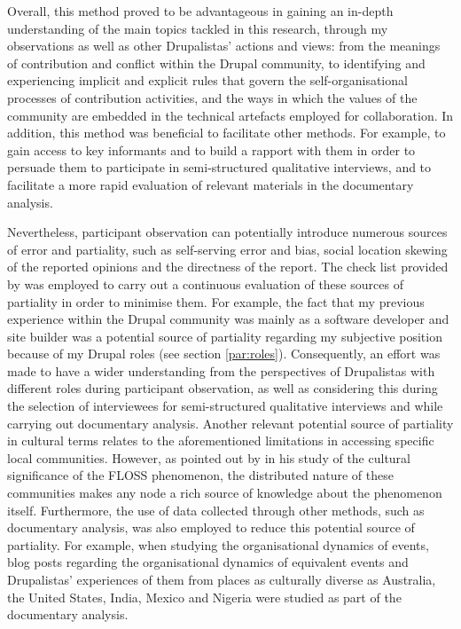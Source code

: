 Overall, this method proved to be advantageous in gaining an in-depth understanding of the main topics tackled in this research, through my observations as well as other Drupalistas' actions and views: from the meanings of contribution and conflict within the Drupal community, to identifying and experiencing implicit and explicit rules that govern the self-organisational processes of contribution activities, and the ways in which the values of the community are embedded in the technical artefacts employed for collaboration. In addition, this method was beneficial to facilitate other methods. For example, to gain access to key informants and to build a rapport with them in order to persuade them to participate in semi-structured qualitative interviews, and to facilitate a more rapid evaluation of relevant materials in the documentary analysis. 

Nevertheless, participant observation can potentially introduce numerous sources of error and partiality, such as self-serving error and bias, social location skewing of the reported opinions and the directness of the report. The check list provided by \textcite{lofland2006analyzing} was employed to carry out a continuous evaluation of these sources of partiality in order to minimise them. For example, the fact that my previous experience within the Drupal community was mainly as a software developer and site builder was a potential source of partiality regarding my subjective position because of my Drupal roles (see section \ref{par:roles}). Consequently, an effort was made to have a wider understanding from the perspectives of Drupalistas with different roles during participant observation, as well as considering this during the selection of interviewees for semi-structured qualitative interviews and while carrying out documentary analysis. Another relevant potential source of partiality in cultural terms relates to the aforementioned limitations in accessing specific local communities. However, as pointed out by \textcite{kelty2008two} in his study of the cultural significance of the FLOSS phenomenon, the distributed nature of these communities makes any node a rich source of knowledge about the phenomenon itself.  Furthermore, the use of data collected through other methods, such as documentary analysis, was also employed to reduce this potential source of partiality. For example, when studying the organisational dynamics of events, blog posts regarding the organisational dynamics of equivalent events and Drupalistas' experiences of them from places as culturally diverse as Australia, the United States, India, Mexico and Nigeria were studied as part of the documentary analysis.


